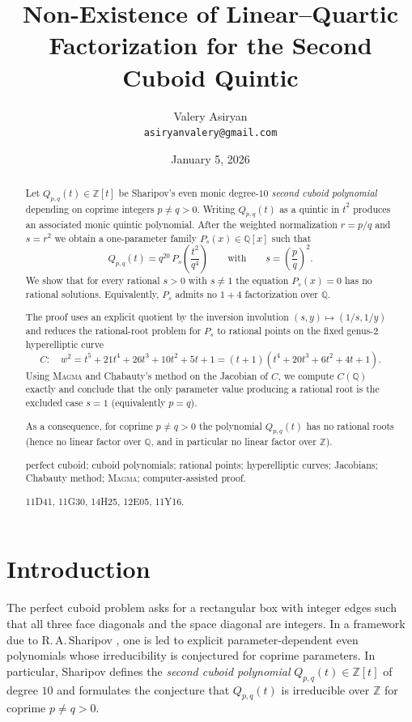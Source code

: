 \documentclass[12pt]{article}
\title{Non-Existence of Linear--Quartic Factorization for the Second Cuboid Quintic}
\author{Valery Asiryan\\[3pt]
\small \texttt{asiryanvalery@gmail.com}}
\date{\small January 5, 2026}
\theoremstyle{remark}
\theoremstyle{definition}
\begin{document}
\maketitle

\begin{abstract}
Let $Q_{p,q}(t)\in\mathbb{Z}[t]$ be Sharipov's even monic degree-$10$ \emph{second cuboid polynomial} depending on coprime integers $p\neq q>0$.
Writing $Q_{p,q}(t)$ as a quintic in $t^{2}$ produces an associated monic quintic polynomial.
After the weighted normalization $r=p/q$ and $s=r^{2}$ we obtain a one-parameter family $P_s(x)\in\mathbb{Q}[x]$ such that
\[
Q_{p,q}(t)=q^{20}\,P_s\!\left(\frac{t^{2}}{q^{4}}\right)\qquad\text{with}\qquad s=\left(\frac{p}{q}\right)^{2}.
\]
We show that for every rational $s>0$ with $s\neq 1$ the equation $P_s(x)=0$ has no rational solutions.
Equivalently, $P_s$ admits no $1+4$ factorization over $\mathbb{Q}$.

The proof uses an explicit quotient by the inversion involution $(s,y)\mapsto(1/s,1/y)$ and reduces the rational-root problem for $P_s$ to rational points on the fixed genus-$2$ hyperelliptic curve
\[
C:\quad w^2=t^5+21t^4+26t^3+10t^2+5t+1=(t+1)(t^4+20t^3+6t^2+4t+1).
\]
Using \textsc{Magma} and Chabauty's method on the Jacobian of $C$, we compute $C(\mathbb{Q})$ exactly and conclude that the only parameter value producing a rational root is the excluded case $s=1$ (equivalently $p=q$).

As a consequence, for coprime $p\neq q>0$ the polynomial $Q_{p,q}(t)$ has no rational roots (hence no linear factor over $\mathbb{Q}$, and in particular no linear factor over $\mathbb{Z}$).

\medskip
{}
perfect cuboid; cuboid polynomials; rational points; hyperelliptic curves; Jacobians; Chabauty method; \textsc{Magma}; computer-assisted proof.

\smallskip
{} 11D41, 11G30, 14H25, 12E05, 11Y16.
\end{abstract}


\section{Introduction}\label{sec:intro}

The perfect cuboid problem asks for a rectangular box with integer edges such that all three face diagonals and the space diagonal are integers.
In a framework due to R.\,A.\,Sharipov \cite{Sharipov2011Cuboids,Sharipov2011Note}, one is led to explicit parameter-dependent even polynomials whose irreducibility is conjectured for coprime parameters.
In particular, Sharipov defines the \emph{second cuboid polynomial} $Q_{p,q}(t)\in\mathbb{Z}[t]$ of degree $10$ and formulates the conjecture that $Q_{p,q}(t)$ is irreducible over $\mathbb{Z}$ for coprime $p\neq q>0$.
\end{document}
